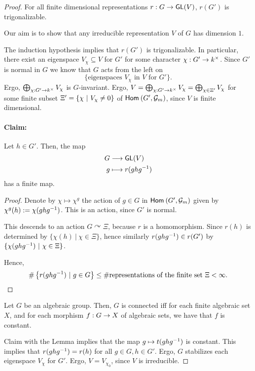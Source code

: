 \begin{proof}
For all finite dimensional representations $r : G \overset{}{\rightarrow} \textsf{GL}(V)$, $r(G')$ is trigonalizable.



Our aim is to show that any irreducible representation $V$ of $G$ has dimension $1$.

The induction hypothesis implies that $r(G')$ is trigonalizable. In particular, there exist an eigenspace $V_\chi \subseteq V$ for $G'$ for some character $\chi : G' \overset{}{\rightarrow} k^\times$. Since $G'$ is normal in $G$ we know that $G$ acts from the left on
\[\{ \text{eigenspaces }V_\chi \text{ in } V \text{ for } G' \}.\] 
Ergo, $\bigoplus_{\chi : G' \overset{}{\rightarrow} k^\times}V_\chi$ is $G$-invariant. Ergo, $V = \bigoplus_{\chi : G' \overset{}{\rightarrow} k^\times}V_\chi = \bigoplus_{\chi \in \Xi'}V_\chi $ for
some finite subset $\Xi' = \left\lbrace\chi ~ | ~ V_\chi \neq 0\right\rbrace$ of $\textsf{Hom}_{}\left(G', \mathcal{G}_m\right)$, since $V$ is finite dimensional.


\paragraph{Claim:} Let $h \in G'$. Then, the map
\begin{align*}
G & \overset{}{\longrightarrow} \textsf{GL}(V)\\
g & \longmapsto r(ghg^{-1})
\end{align*}
has a finite map.
\begin{proof}
	Denote by $\chi \mapsto \chi^g$ the action of $g \in G$ in $\textsf{Hom}_{}\left(G', \mathcal{G}_m\right)$ given by $\chi^g(h) := \chi(ghg^{-1})$. This is an action, since $G'$ is normal.
	
	This descends to an action $G\curvearrowright \Xi$, because $r$ is a homomorphism. Since $r(h)$ is determined by $\{ \chi(h)~|~ \chi \in \Xi \}$, hence similarly $r(ghg^{-1}) \in r(G')$ by $\{ \chi(ghg^{-1}) ~|~ \chi \in \Xi \}$.
	
	Hence,
	\[ \# \left\lbrace r(ghg^{-1}) ~ | ~ g \in G\right\rbrace \leq \# \text{representations of the finite set }\Xi < \infty. \]
\end{proof}
\begin{lemma}
Let $G$ be an algebraic group. Then, $G$ is connected iff for each finite algebraic set $X$, and for each morphism $f : G \overset{}{\rightarrow} X$ of algebraic sets, we have that $f$ is constant.
\end{lemma}
Claim with the Lemma implies that the map $g \mapsto t(ghg^{-1})$ is constant. This implies that $r(ghg^{-1}) = r(h)$ for all $g \in G, h \in G'$. Ergo, $G$ stabilizes each eigenspace $V_\chi$ for $G'$. Ergo, $V = V_{\chi_0}$, since $V$ is irreducible.


\end{proof}


